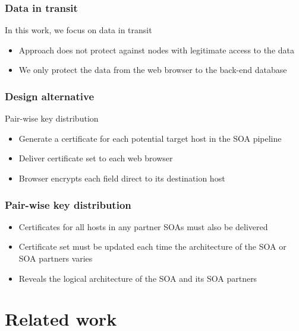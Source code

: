 \documentclass{beamer}
\begin{document}
\begin{frame}
\frametitle{Data in transit}
In this work, we focus on data in transit
\smallskip
\begin{itemize}
\item Approach does not protect against nodes with legitimate access to the data
\item We only protect the data from the web browser to the back-end database
\end{itemize}
\end{frame}


\begin{frame}
\frametitle{Design alternative}
Pair-wise key distribution
\smallskip
\begin{itemize}
\item Generate a certificate for each potential target host in the SOA pipeline
\item Deliver certificate set to each web browser
\item Browser encrypts each field direct to its destination host 
\end{itemize}
\end{frame}

\begin{frame}
\frametitle{Pair-wise key distribution}
\begin{itemize}
\item Certificates for all hosts in any partner SOAs must also be delivered
\item Certificate set must be updated each time the architecture of the SOA or
SOA partners varies
\item Reveals the logical architecture of the SOA and its SOA partners
\end{itemize}
\end{frame}

\section{Related work}
\end{document}
